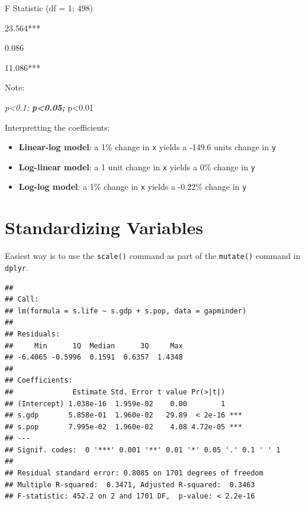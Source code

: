 \documentclass[]{book}
\newenvironment{Shaded}{\begin{snugshade}}{\end{snugshade}}
\newcommand{\KeywordTok}[1]{\textcolor[rgb]{0.13,0.29,0.53}{\textbf{#1}}}
\newcommand{\DataTypeTok}[1]{\textcolor[rgb]{0.13,0.29,0.53}{#1}}
\newcommand{\StringTok}[1]{\textcolor[rgb]{0.31,0.60,0.02}{#1}}
\newcommand{\OperatorTok}[1]{\textcolor[rgb]{0.81,0.36,0.00}{\textbf{#1}}}
\newcommand{\NormalTok}[1]{#1}
\providecommand{\tightlist}{%
  \setlength{\itemsep}{0pt}\setlength{\parskip}{0pt}}
\theoremstyle{definition}
\theoremstyle{definition}
\theoremstyle{definition}
\theoremstyle{remark}
\begin{document}
F Statistic (df = 1; 498)

23.564***

0.086

11.086***

Note:

\emph{p\textless{}0.1; \textbf{p\textless{}0.05; }}p\textless{}0.01

Interpretting the coefficients:

\begin{itemize}
\tightlist
\item
  \textbf{Linear-log model}: a 1\% change in \texttt{x} yields a -149.6
  units change in \texttt{y}
\item
  \textbf{Log-linear model}: a 1 unit change in \texttt{x} yields a 0\%
  change in \texttt{y}
\item
  \textbf{Log-log model}: a 1\% change in \texttt{x} yields a -0.22\%
  change in \texttt{y}
\end{itemize}

\section{Standardizing Variables}\label{standardizing-variables}

Easiest way is to use the \texttt{scale()} command as part of the
\texttt{mutate()} command in \texttt{dplyr}.

\begin{Shaded}
\end{Shaded}

\begin{verbatim}
## 
## Call:
## lm(formula = s.life ~ s.gdp + s.pop, data = gapminder)
## 
## Residuals:
##     Min      1Q  Median      3Q     Max 
## -6.4065 -0.5996  0.1591  0.6357  1.4348 
## 
## Coefficients:
##              Estimate Std. Error t value Pr(>|t|)    
## (Intercept) 1.038e-16  1.959e-02    0.00        1    
## s.gdp       5.858e-01  1.960e-02   29.89  < 2e-16 ***
## s.pop       7.995e-02  1.960e-02    4.08 4.72e-05 ***
## ---
## Signif. codes:  0 '***' 0.001 '**' 0.01 '*' 0.05 '.' 0.1 ' ' 1
## 
## Residual standard error: 0.8085 on 1701 degrees of freedom
## Multiple R-squared:  0.3471, Adjusted R-squared:  0.3463 
## F-statistic: 452.2 on 2 and 1701 DF,  p-value: < 2.2e-16
\end{verbatim}
\end{document}
